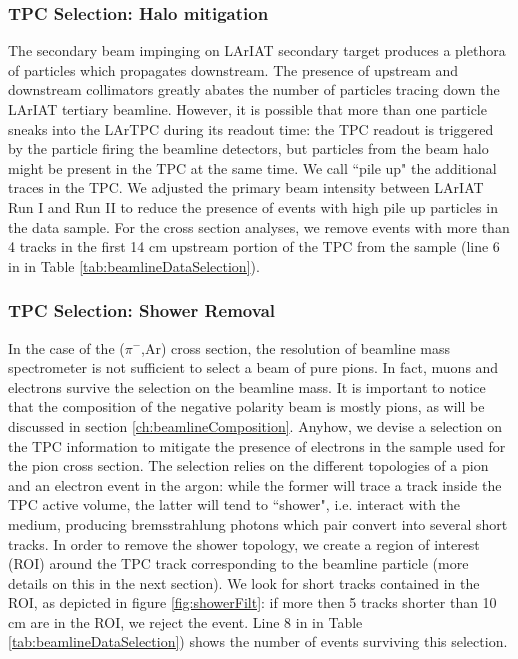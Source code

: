 \subsubsection{TPC Selection: Halo mitigation }\label{ch:pileUp}
The secondary beam impinging on LArIAT secondary target produces a plethora of particles which propagates downstream. The presence of upstream and downstream collimators greatly abates the number of particles tracing down the LArIAT tertiary beamline. However, it is possible that more than one particle sneaks into the LArTPC during its readout time: the TPC readout is triggered by the particle  firing the beamline detectors, but particles from the beam halo might be present in the TPC at the same time. We call ``pile up" the additional traces in the TPC. We adjusted the primary beam intensity between LArIAT Run I and Run II to reduce the presence of events with high pile up particles in the data sample. For the cross section analyses, we remove events with more than 4 tracks in the first 14 cm upstream portion of the TPC from the sample (line 6 in in Table \ref{tab:beamlineDataSelection}).


\subsubsection{TPC Selection: Shower Removal}\label{ch:electrons}
In the case of the ($\pi^-$,Ar) cross section, the resolution of  beamline mass spectrometer is not sufficient to select a beam of pure pions. In fact, muons and electrons survive the selection on the beamline mass. It is important to notice that the composition of the negative polarity beam is mostly pions, as will be discussed in section \ref{ch:beamlineComposition}.
Anyhow, we devise a selection on the TPC information to mitigate the presence of electrons in the sample used for the pion cross section. The selection relies on the different topologies of a pion and an electron event in the argon: while the former will trace a track inside the TPC active volume, the latter will tend to ``shower", i.e. interact with the medium, producing bremsstrahlung photons which pair convert into several short tracks. In order to remove the shower topology, we create a region of interest (ROI) around the TPC track corresponding to the beamline particle (more details on this in the next section). We look for short tracks contained in the ROI, as depicted in figure \ref{fig:showerFilt}:  if more then 5 tracks shorter than 10 cm are in the ROI, we reject the event. Line 8 in in Table \ref{tab:beamlineDataSelection}) shows the number of events surviving this selection.

